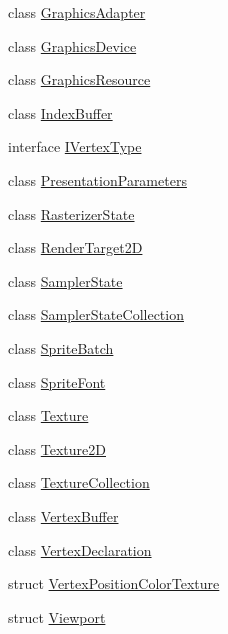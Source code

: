 \begin{DoxyCompactItemize}
class \hyperlink{class_microsoft_1_1_xna_1_1_framework_1_1_graphics_1_1_graphics_adapter}{Graphics\+Adapter}
\item 
class \hyperlink{class_microsoft_1_1_xna_1_1_framework_1_1_graphics_1_1_graphics_device}{Graphics\+Device}
\item 
class \hyperlink{class_microsoft_1_1_xna_1_1_framework_1_1_graphics_1_1_graphics_resource}{Graphics\+Resource}
\item 
class \hyperlink{class_microsoft_1_1_xna_1_1_framework_1_1_graphics_1_1_index_buffer}{Index\+Buffer}
\item 
interface \hyperlink{interface_microsoft_1_1_xna_1_1_framework_1_1_graphics_1_1_i_vertex_type}{I\+Vertex\+Type}
\item 
class \hyperlink{class_microsoft_1_1_xna_1_1_framework_1_1_graphics_1_1_presentation_parameters}{Presentation\+Parameters}
\item 
class \hyperlink{class_microsoft_1_1_xna_1_1_framework_1_1_graphics_1_1_rasterizer_state}{Rasterizer\+State}
\item 
class \hyperlink{class_microsoft_1_1_xna_1_1_framework_1_1_graphics_1_1_render_target2_d}{Render\+Target2\+D}
\item 
class \hyperlink{class_microsoft_1_1_xna_1_1_framework_1_1_graphics_1_1_sampler_state}{Sampler\+State}
\item 
class \hyperlink{class_microsoft_1_1_xna_1_1_framework_1_1_graphics_1_1_sampler_state_collection}{Sampler\+State\+Collection}
\item 
class \hyperlink{class_microsoft_1_1_xna_1_1_framework_1_1_graphics_1_1_sprite_batch}{Sprite\+Batch}
\item 
class \hyperlink{class_microsoft_1_1_xna_1_1_framework_1_1_graphics_1_1_sprite_font}{Sprite\+Font}
\item 
class \hyperlink{class_microsoft_1_1_xna_1_1_framework_1_1_graphics_1_1_texture}{Texture}
\item 
class \hyperlink{class_microsoft_1_1_xna_1_1_framework_1_1_graphics_1_1_texture2_d}{Texture2\+D}
\item 
class \hyperlink{class_microsoft_1_1_xna_1_1_framework_1_1_graphics_1_1_texture_collection}{Texture\+Collection}
\item 
class \hyperlink{class_microsoft_1_1_xna_1_1_framework_1_1_graphics_1_1_vertex_buffer}{Vertex\+Buffer}
\item 
class \hyperlink{class_microsoft_1_1_xna_1_1_framework_1_1_graphics_1_1_vertex_declaration}{Vertex\+Declaration}
\item 
struct \hyperlink{struct_microsoft_1_1_xna_1_1_framework_1_1_graphics_1_1_vertex_position_color_texture}{Vertex\+Position\+Color\+Texture}
\item 
struct \hyperlink{struct_microsoft_1_1_xna_1_1_framework_1_1_graphics_1_1_viewport}{Viewport}
\end{DoxyCompactItemize}
